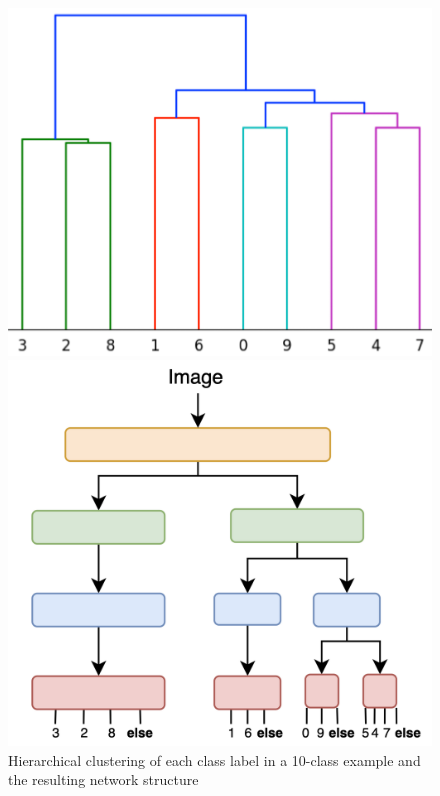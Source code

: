 \begin{figure}
    \centering
    \begin{minipage}[b]{.4\textwidth}
        \centering
        \includegraphics[width=.9\linewidth]{images/hierfig.png}
    \end{minipage}%
    \begin{minipage}[b]{.4\textwidth}
        \centering
        \includegraphics[width=.9\linewidth]{images/example_hier.png}
    \end{minipage}
    \caption{Hierarchical clustering of each class label in a 10-class example and the resulting network structure}
    \label{fig:hierarchy}
\end{figure}


